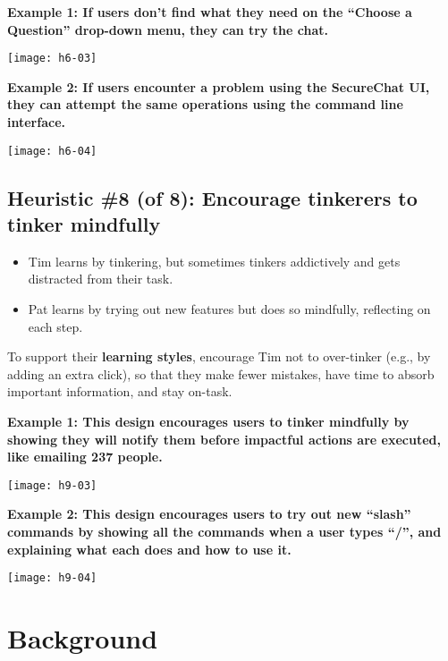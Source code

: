 \spacer
\noindent\textbf{Example 1: If users don't find what they need on the ``Choose a Question'' drop-down menu, they can try the chat.}\\
\begin{center}
\noindent\texttt{[image: h6-03]}
\end{center}

\noindent\textbf{Example 2: If users encounter a problem using the SecureChat UI, they can attempt the same operations using the command line interface.}\\
\begin{center}
\noindent\texttt{[image: h6-04]}
\end{center}

\subsection{Heuristic \#8 (of 8): Encourage tinkerers to tinker mindfully}

\begin{itemize}
\item Tim learns by tinkering, but sometimes tinkers addictively and gets distracted from their task.
\item Pat learns by trying out new features but does so mindfully, reflecting on each step.
\end{itemize}

\noindent To support their \textbf{learning styles}, encourage Tim not to over-tinker (e.g., by adding an extra click), so that they make fewer mistakes, have time to absorb important information, and stay on-task.

\spacer
\noindent\textbf{Example 1: This design encourages users to tinker mindfully by showing they will notify them before impactful actions are executed, like emailing 237 people.}\\
\begin{center}
\noindent\texttt{[image: h9-03]}
\end{center}

\noindent\textbf{Example 2: This design encourages users to try out new ``slash'' commands by showing all the commands when a user types ``/'', and explaining what each does and how to use it.}\\
\begin{center}
\noindent\texttt{[image: h9-04]}
\end{center}

\yesmargins
\section{Background}

